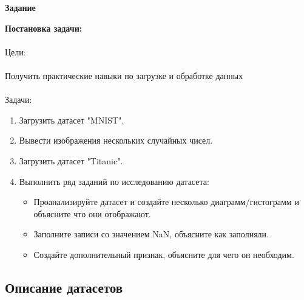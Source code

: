 \documentclass[a4paper]{article}
\begin{document}
\newpage
\begin{center}
    \hfill \break
    \textbf{Задание}\\
\end{center}  
\normalsize{
    \textbf{Постановка задачи:}\\\\
    Цели:\\\\
    Получить практические навыки по загрузке и обработке данных\\\\
    Задачи:\\
    \begin{enumerate}
        \item Загрузить датасет "MNIST".
        \item Вывести изображения нескольких случайных чисел.
        \item Загрузить датасет "Titanic".
        \item Выполнить ряд заданий по исследованию датасета:
        \begin{itemize}
            \item Проанализируйте датасет и создайте несколько диаграмм/гистограмм и объясните что они отображают.
            \item Заполните записи со значением NaN, объясните как заполняли.
            \item Создайте дополнительный признак, объясните для чего он необходим.
        \end{itemize}
    \end{enumerate}
}


\newpage
\begin{center}
    \hfill \break
    \section{Описание датасетов}
\end{center}
\end{document}
